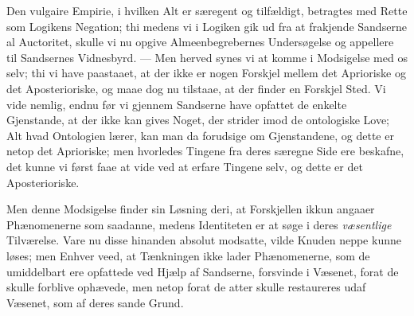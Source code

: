 \documentclass[12pt]{book}
\begin{document}
Den vulgaire Empirie, i hvilken Alt er særegent og tilfældigt, betragtes med
Rette som Logikens Negation; thi medens vi i Logiken gik ud fra at frakjende
Sandserne al Auctoritet, skulle vi nu opgive Almeenbegrebernes Undersøgelse og
appellere til Sandsernes Vidnesbyrd. --- Men herved synes vi at komme i
Modsigelse med os selv; thi vi have paastaaet, at der ikke er nogen Forskjel
mellem det Aprioriske og det Aposterioriske, og maae dog nu tilstaae, at der
finder en Forskjel Sted. Vi vide nemlig, endnu før vi gjennem Sandserne have
opfattet de enkelte Gjenstande, at der ikke kan gives Noget, der strider imod
de ontologiske Love; Alt hvad Ontologien lærer, kan man da forudsige om
Gjenstandene, og dette er netop det Aprioriske; men hvorledes Tingene fra
deres særegne Side ere beskafne, det kunne vi først faae at vide ved at erfare
Tingene selv, og dette er det Aposterioriske.

Men denne Modsigelse finder sin Løsning deri, at Forskjellen ikkun angaaer
Phænomenerne som saadanne, medens Identiteten er at søge i deres
\emph{væsentlige} Tilværelse. Vare nu disse hinanden absolut modsatte, vilde
Knuden neppe kunne løses; men Enhver veed, at Tænkningen ikke lader
Phænomenerne, som de umiddelbart ere opfattede ved Hjælp af Sandserne,
forsvinde i Væsenet, forat de skulle forblive ophævede, men netop forat de
atter skulle restaureres udaf Væsenet, som af deres sande Grund.
\end{document}
